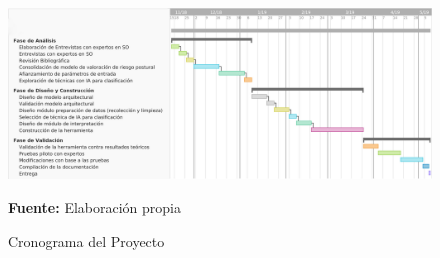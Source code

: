 \begin{landscape}
\begin{figure}[H]
    \centering
    \includegraphics[scale=1]{Anexos/LATEX/chapters/images/CronogramaTesis.jpg}
    \caption{Cronograma del Proyecto}
    \small{\textbf{Fuente:} Elaboración propia}
    \label{cronograma}
\end{figure}
\end{landscape}